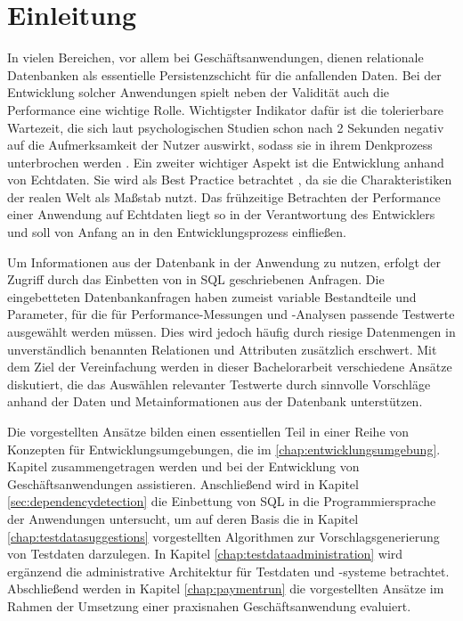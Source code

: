 \section{Einleitung}\label{chap:introduction}

%
%

In vielen Bereichen, vor allem bei Geschäftsanwendungen, dienen relationale Datenbanken als essentielle Persistenzschicht für die anfallenden Daten.
Bei der Entwicklung solcher Anwendungen spielt neben der Validität auch die Performance eine wichtige Rolle.
Wichtigster Indikator dafür ist die tolerierbare Wartezeit, die sich laut psychologischen Studien schon nach 2 Sekunden negativ auf die Aufmerksamkeit der Nutzer auswirkt, sodass sie in ihrem Denkprozess unterbrochen werden \cite{Nah04}.
Ein zweiter wichtiger Aspekt ist die Entwicklung anhand von Echtdaten.
Sie wird als Best Practice betrachtet \cite{Plattner:2013:CID:2490529}, da sie die Charakteristiken der realen Welt als Maßstab nutzt.
Das frühzeitige Betrachten der Performance einer Anwendung auf Echtdaten liegt so in der Verantwortung des Entwicklers und soll von Anfang an in den Entwicklungsprozess einfließen.

Um Informationen aus der Datenbank in der Anwendung zu nutzen, erfolgt der Zugriff durch das Einbetten von in SQL geschriebenen Anfragen.
Die eingebetteten Datenbankanfragen haben zumeist variable Bestandteile und Parameter, für die für Performance-Messungen und -Analysen passende Testwerte ausgewählt werden müssen.
Dies wird jedoch häufig durch riesige Datenmengen in unverständlich benannten Relationen und Attributen zusätzlich erschwert.
Mit dem Ziel der Vereinfachung werden in dieser Bachelorarbeit verschiedene Ansätze diskutiert, die das Auswählen relevanter Testwerte durch sinnvolle Vorschläge anhand der Daten und Metainformationen aus der Datenbank unterstützen.

Die vorgestellten Ansätze bilden einen essentiellen Teil in einer Reihe von Konzepten für Entwicklungsumgebungen, die im \ref{chap:entwicklungsumgebung}. Kapitel zusammengetragen werden und bei der Entwicklung von Geschäftsanwendungen assistieren.
Anschließend wird in Kapitel \ref{sec:dependencydetection} die Einbettung von SQL in die Programmiersprache der Anwendungen untersucht, um auf deren Basis die in Kapitel \ref{chap:testdatasuggestions} vorgestellten Algorithmen zur Vorschlagsgenerierung von Testdaten darzulegen.
In Kapitel \ref{chap:testdataadministration} wird ergänzend die administrative Architektur für Testdaten und -systeme betrachtet.
Abschließend werden in Kapitel \ref{chap:paymentrun} die vorgestellten Ansätze im Rahmen der Umsetzung einer praxisnahen Geschäftsanwendung evaluiert.